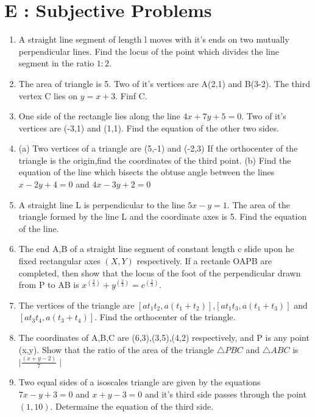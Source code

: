 \documentclass[12pt]{article}
\begin{document}
\section*{E  :  Subjective Problems}
\begin{enumerate}


\item  A straight line segment of length l moves with it's ends on two mutually perpendicular lines. Find the locus of the point which divides the line segment in the ratio $1:2$.
\item The area of triangle is 5. Two of it's vertices are A(2,1) and B(3-2). The third vertex C lies on $y=x+3$. Finf C.
\item One side of the rectangle lies along the line $4x+7y+5=0$. Two of it's vertices are (-3,1) and (1,1). Find the equation of the other two sides.
\item(a) Two vertices of a triangle are (5,-1) and (-2,3) If the orthocenter of the triangle is the origin,find the coordinates of the third point.
(b) Find the equation of the line which bisects the obtuse angle between the lines $x-2y+4=0$ and $4x-3y+2=0$\\
\item  A straight line L is perpendicular to the line $5x-y=1$. The area of the triangle formed by the line L and the coordinate axes is 5. Find the equation of the line.\\
\item The end A,B of a straight line segment of constant length c slide upon he fixed rectangular axes $(X,Y)$ respectively. If a rectanle OAPB are completed, then show that the locus of the foot of the perpendicular drawn from P to AB is $x^(\frac{2}{3})+y^(\frac{2}{3})=c^(\frac{2}{3})$.\\
\item The vertices of the triangle are $[at_1t_2,a(t_1+t_2)]$,$[at_1t_3,a(t_1+t_3)]$ and $[at_3t_4,a(t_3+t_4)]$. Find the orthocenter of the triangle.\\
\item The coordinates of A,B,C are  (6,3),(3,5),(4,2) respectively, and P is any point (x,y). Show that the ratio of the area of the triangle $\triangle PBC$ and $\triangle ABC $ is $\mid\frac{(x+y-2)}{7}\mid$\\
\item Two equal sides of a isoscales triangle are given by the equations $7x-y+3=0$ and $x+y-3=0$ and it's third side passes through the point $(1,10)$. Determaine the equation of the third side.\\

\end{enumerate}
\end{document}
